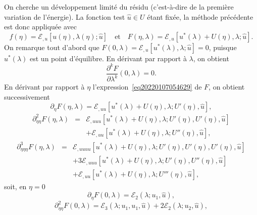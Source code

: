 \documentclass[12pt, final]{amsart}
\begin{document}
On cherche un d{\'e}veloppement limit{\'e} du r{\'e}sidu (c'est-{\`a}-dire de
la premi{\`e}re variation de l'{\'e}nergie). La fonction test $\hat{u} \in U$
{\'e}tant fix{\'e}e, la m{\'e}thode pr{\'e}c{\'e}dente est donc appliqu{\'e}e
avec
\begin{equation}
  \label{eq20220107054629} f (\eta) =\mathcal{E}_{, u} [u (\eta), \lambda
  (\eta) ; \hat{u}] \quad \text{et} \quad F (\eta, \lambda) =\mathcal{E}_{, u}
  [u^{\ast} (\lambda) + U (\eta), \lambda ; \hat{u}] .
\end{equation}
On remarque tout d'abord que $F (0, \lambda) =\mathcal{E}_{, u} [u^{\ast}
(\lambda), \lambda ; \hat{u}] = 0$, puisque $u^{\ast} (\lambda)$ est un point
d'{\'e}quilibre. En d{\'e}rivant par rapport {\`a} $\lambda$, on obtient
\begin{equation}
  \label{eq20211112164240} \frac{\partial^k F}{\partial \lambda^k} (0,
  \lambda) = 0.
\end{equation}
En d{\'e}rivant par rapport {\`a} $\eta$ l'expression~\eqref{eq20220107054629}
de $F$, on obtient successivement
\begin{equation}
  \partial_{\eta} F (\eta, \lambda) =\mathcal{E}_{, u  u} [u^{\ast}
  (\lambda) + U (\eta), \lambda ; U' (\eta), \hat{u}],
\end{equation}
\begin{eqnarray}
  \partial_{\eta  \eta}^2 F (\eta, \lambda) & = & \mathcal{E}_{, u
   u  u} [u^{\ast} (\lambda) + U (\eta), \lambda ; U' (\eta),
  U' (\eta), \hat{u}] \nonumber\\
  &  &  +\mathcal{E}_{, u  u} [u^{\ast} (\lambda) + U
  (\eta), \lambda ; U'' (\eta), \hat{u}],
\end{eqnarray}
\begin{eqnarray}
  \partial_{\eta  \eta  \eta}^3 F (\eta, \lambda) & = &
  \mathcal{E}_{, u  u  u  u} [u^{\ast} (\lambda) + U
  (\eta), \lambda ; U' (\eta), U' (\eta), U' (\eta), \hat{u}] \nonumber\\
  &  &  + 3\mathcal{E}_{, u  u  u} [u^{\ast}
  (\lambda) + U (\eta), \lambda ; U' (\eta), U'' (\eta), \hat{u}] \nonumber\\
  &  &  +\mathcal{E}_{, u  u} [u^{\ast} (\lambda) + U
  (\eta), \lambda ; U''' (\eta), \hat{u}],
\end{eqnarray}
soit, en $\eta = 0$
\begin{equation}
  \partial_{\eta} F (0, \lambda) =\mathcal{E}_2 (\lambda ; u_1, \hat{u}),
\end{equation}
\begin{equation}
  \partial_{\eta  \eta}^2 F (0, \lambda) =\mathcal{E}_3 (\lambda ;
  u_1, u_1, \hat{u}) + 2\mathcal{E}_2 (\lambda ; u_2, \hat{u}),
\end{equation}
\end{document}
